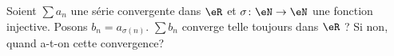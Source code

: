 
\begin{exercice}\label{exo0065}

Soient $\sum a_n$ une série convergente dans $\eR$ et $\sigma\colon \eN\to \eN$ une fonction injective. Posons $b_n=a_{\sigma(n)}$.  $\sum b_n$ converge telle toujours dans $\eR$ ? Si non, quand a-t-on cette convergence?


\end{exercice}
